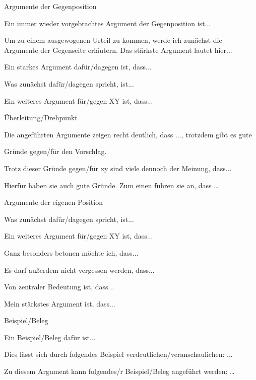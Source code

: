 \begin{compactitem}
    \item Argumente der Gegenposition 
    \begin{compactitem}
        \item Ein immer wieder vorgebrachtes Argument der Gegenposition ist... 
        \item Um zu einem ausgewogenen Urteil zu kommen, werde ich zunächst die Argumente der Gegenseite erläutern. Das stärkste Argument lautet hier...
        \item Ein starkes Argument dafür/dagegen ist, dass... 
        \item Was zunächst dafür/dagegen spricht, ist... 
        \item Ein weiteres Argument für/gegen XY ist, dass... 
    \end{compactitem}
    \item Überleitung/Drehpunkt 
    \begin{compactitem}
        \item Die angeführten Argumente zeigen recht deutlich, dass ..., trotzdem gibt es gute  
        \item Gründe gegen/für den Vorschlag. 
        \item Trotz dieser Gründe gegen/für xy sind viele dennoch der Meinung, dass...  
        \item Hierfür haben sie auch gute Gründe. Zum einen führen sie an, dass … 
    \end{compactitem}
    \item Argumente der eigenen Position 
    \begin{compactitem}
        \item Was zunächst dafür/dagegen spricht, ist... 
        \item Ein weiteres Argument für/gegen XY ist, dass... 
        \item Ganz besonders betonen möchte ich, dass...
        \item  Es darf außerdem nicht vergessen werden, dass... 
        \item Von zentraler Bedeutung ist, dass...
        \item Mein stärkstes Argument ist, dass... 
    \end{compactitem}
    \item Beispiel/Beleg 
    \begin{compactitem}
        \item Ein Beispiel/Beleg dafür ist...
        \item Dies lässt sich durch folgendes Beispiel verdeutlichen/veranschaulichen: ... 
        \item Zu diesem Argument kann folgendes/r Beispiel/Beleg angeführt werden: … 
    \end{compactitem}
\end{compactitem}
